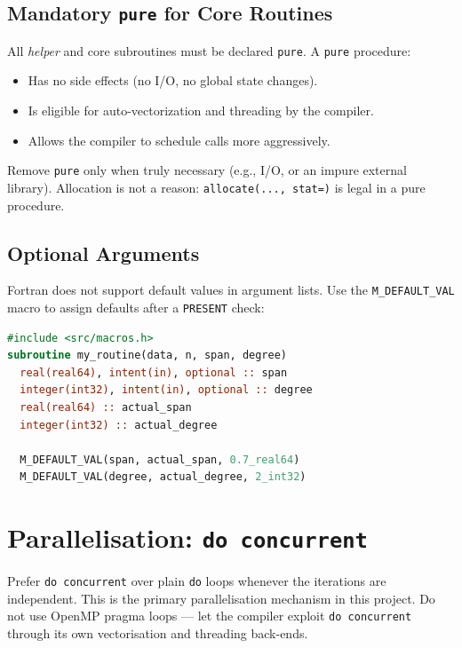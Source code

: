 \documentclass{article}
\begin{document}
\subsection{Mandatory \texttt{pure} for Core Routines}

All \emph{helper} and core subroutines must be declared \texttt{pure}. A \texttt{pure} procedure:

\begin{itemize}
  \item Has no side effects (no I/O, no global state changes).
  \item Is eligible for auto-vectorization and threading by the compiler.
  \item Allows the compiler to schedule calls more aggressively.
\end{itemize}

Remove \texttt{pure} only when truly necessary (e.g., I/O, or an impure external library). Allocation is not a reason: \texttt{allocate(..., stat=)} is legal in a pure procedure.

\subsection{Optional Arguments}

Fortran does not support default values in argument lists. Use the \texttt{M\_DEFAULT\_VAL} macro to assign defaults after a \texttt{PRESENT} check:

\begin{lstlisting}[language=Fortran]
#include <src/macros.h>
subroutine my_routine(data, n, span, degree)
  real(real64), intent(in), optional :: span
  integer(int32), intent(in), optional :: degree
  real(real64) :: actual_span
  integer(int32) :: actual_degree

  M_DEFAULT_VAL(span, actual_span, 0.7_real64)
  M_DEFAULT_VAL(degree, actual_degree, 2_int32)
\end{lstlisting}

\section{Parallelisation: \texttt{do concurrent}}

Prefer \texttt{do concurrent} over plain \texttt{do} loops whenever the iterations are independent. This is the primary parallelisation mechanism in this project. Do not use OpenMP pragma loops — let the compiler exploit \texttt{do concurrent} through its own vectorisation and threading back-ends.
\end{document}
